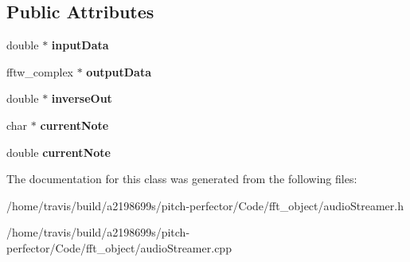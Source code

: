 \subsection*{Public Attributes}
\begin{DoxyCompactItemize}
\item 
\hypertarget{classaudioStreamer_a392bb08783c92e356e704f40ff6a109a}{double $\ast$ {\bfseries input\-Data}}\label{classaudioStreamer_a392bb08783c92e356e704f40ff6a109a}

\item 
\hypertarget{classaudioStreamer_ab44575639696ec28e58a0ca4d5e7d099}{fftw\-\_\-complex $\ast$ {\bfseries output\-Data}}\label{classaudioStreamer_ab44575639696ec28e58a0ca4d5e7d099}

\item 
\hypertarget{classaudioStreamer_a1d8289cf32dd73375172f06c998d7a9f}{double $\ast$ {\bfseries inverse\-Out}}\label{classaudioStreamer_a1d8289cf32dd73375172f06c998d7a9f}

\item 
\hypertarget{classaudioStreamer_a943371f31102ab0f493addfbd685f210}{char $\ast$ {\bfseries current\-Note}}\label{classaudioStreamer_a943371f31102ab0f493addfbd685f210}

\item 
\hypertarget{classaudioStreamer_a721e16ff965429808516f39e93c50b82}{double {\bfseries current\-Note}}\label{classaudioStreamer_a721e16ff965429808516f39e93c50b82}

\end{DoxyCompactItemize}


The documentation for this class was generated from the following files\-:\begin{DoxyCompactItemize}
\item 
/home/travis/build/a2198699s/pitch-\/perfector/\-Code/fft\-\_\-object/audio\-Streamer.\-h\item 
/home/travis/build/a2198699s/pitch-\/perfector/\-Code/fft\-\_\-object/audio\-Streamer.\-cpp\end{DoxyCompactItemize}
